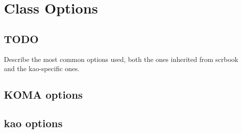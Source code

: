 \renewcommand*{\chapterformat}
{
  \enskip\mbox{\scalebox{3.5}{\framebox{\thechapter\autodot}}}
}
\renewcommand\chapterlinesformat[3]
{
  \parbox[b]{\textwidth+\marginparsep+\marginparwidth}{
	\parbox[b]{\textwidth}{#3}%
	\parbox[b]{\marginparsep}{\hfill}%
	\parbox[b]{\marginparwidth}{#2}%
  }
}
\setchapterpreamble[u]{\margintoc[*-3]}
\chapter{Class Options}

\section{TODO}

Describe the most common options used, both the ones inherited from 
scrbook and the kao-specific ones.

\section{KOMA options}

\section{kao options}
